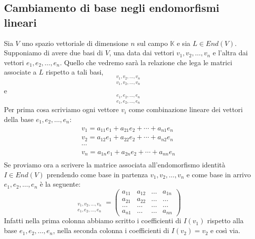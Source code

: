 
\subsection{Cambiamento di base negli endomorfismi lineari}
Sia $V$ uno spazio vettoriale di dimensione $n$ sul campo $\mathbb{K}$
e sia $L \in End(V)$. Supponiamo di avere due basi di $V$, una data dai vettori
$v_1, v_2, \dots, v_n$ e l'altra dai vettori $e_1, e_2, \dots, e_n$. Quello che
vedremo sar\`a la relazione che lega le matrici associate a $L$ rispetto a tali
basi,
\begin{equation*}
	[L]_{\substack{
			v_1, v_2, \dots, v_n \\
			v_1, v_2, \dots, v_n
		}}
\end{equation*}
e
\begin{equation*}
	[L]_{\substack{
			e_1, e_2, \dots, e_n \\
			e_1, e_2, \dots, e_n
		}}
\end{equation*}
Per prima cosa scriviamo ogni vettore $v_i$ come combinazione lineare dei vettori
della base $e_1, e_2, \dots, e_n$:
\begin{gather*}
	v_1 = a_{11}e_1 + a_{21}e_2 + \cdots + a_{n1}e_n \\
	v_2 = a_{12}e_1 + a_{22}e_2 + \cdots + a_{n2}e_n \\
	\cdots                                           \\
	v_n = a_{1n}e_1 + a_{2n}e_2 + \cdots + a_{nn}e_n \\
\end{gather*}
Se proviamo ora a scrivere la matrice associata all'endomorfismo identit\`a
$I \in End(V)$ prendendo come base in partenza $v_1, v_2, \dots, v_n$ e come base
in arrivo $e_1, e_2, \dots, e_n$ \`e la seguente:
\begin{equation*}
	[I]_{\substack{
			v_1, v_2, \dots, v_n \\
			e_1, e_2, \dots, e_n
		}} = \begin{pmatrix}
		a_{11} & a_{12} & \dots & a_{1n} \\
		a_{21} & a_{22} & \dots & \dots  \\
		\dots  & \dots  & \dots & \dots  \\
		a_{n1} & \dots  & \dots & a_{nn}
	\end{pmatrix}
\end{equation*}
Infatti nella prima colonna abbiamo scritto i coefficienti di $I(v_1)$ rispetto
alla base $e_1, e_2, \dots, e_n$, nella seconda colonna i coefficienti di
$I(v_2) = v_2$ e cos\`i via.

